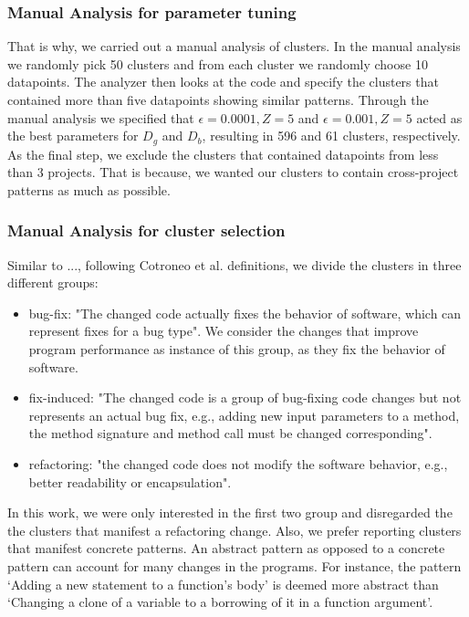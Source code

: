 \subsubsection{\label{sec:manual_analysis_parameter_tuning}Manual Analysis for parameter tuning}

That is why, we carried out a manual analysis of clusters. In the manual analysis we randomly pick 50 clusters and from each cluster we randomly choose 10 datapoints. The analyzer then looks at the code and specify the clusters that contained more than five datapoints showing similar patterns. Through the manual analysis we specified that $\epsilon=0.0001, Z=5$ and $\epsilon=0.001, Z=5$ acted as the best parameters for $D_g$ and $D_b$, resulting in 596 and 61 clusters, respectively. As the final step, we exclude the clusters that contained datapoints from less than 3 projects. That is because, we wanted our clusters to contain cross-project patterns as much as possible.  

\subsubsection{\label{sec:manual_analysis_cluster_selection}Manual Analysis for cluster selection}

Similar to ..., following Cotroneo et al. definitions, we divide the clusters in three different groups:

\begin{itemize}
    \item bug-fix: "The changed code actually fixes the behavior of software, which can represent fixes for a bug type". We consider the changes that improve program performance as instance of this group, as they fix the behavior of software.
    
    \item fix-induced: "The changed code is a group of bug-fixing code changes but not represents an actual bug fix, e.g., adding new input parameters to a method, the method signature and method call must be changed corresponding".
    
    \item refactoring: "the changed code does not modify the software behavior, e.g., better readability or encapsulation".
\end{itemize}

In this work, we were only interested in the first two group and disregarded the the clusters that manifest a refactoring change. Also, we prefer reporting clusters that manifest concrete patterns. An abstract pattern as opposed to a concrete pattern can account for many changes in the programs. For instance, the pattern `Adding a new statement to a function's body' is deemed more abstract than `Changing a clone of a variable to a borrowing of it in a function argument'.

